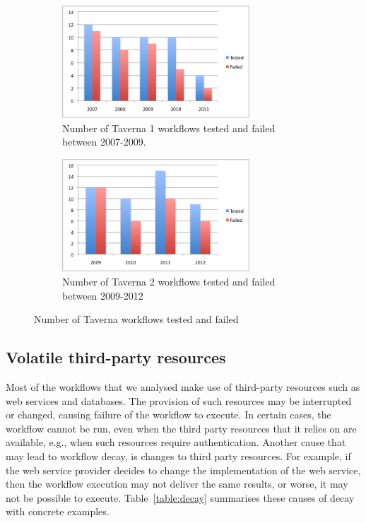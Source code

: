 \begin{figure}[h]
  \centering
  \begin{subfigure}[t]{9cm}
    \centering
    \includegraphics[width=7cm]{./Figures/taverna1-workflows-rate.png}
    \caption{Number of Taverna 1 workflows tested and failed between 2007-2009.}
  \end{subfigure}
  \begin{subfigure}[t]{9cm}
    \centering
    \includegraphics[width=7cm]{./Figures/taverna2-workflows-rate.png}
    \caption{Number of Taverna 2 workflows tested and failed between 2009-2012}
  \end{subfigure}
  \caption{Number of Taverna workflows tested and failed}
  \label{fig:taverna-wf-failed}
\end{figure}



\subsection{Volatile third-party resources}
Most of the workflows that we analysed make use of third-party resources such as web services and databases.
The provision of such resources may be interrupted or changed, causing failure of the workflow to execute. In certain cases, the workflow cannot be run, even when the third party resources that it relies on are available, e.g.,  when such resources require authentication. Another cause that may lead to workflow decay, is changes to third party resources. For example, if the web service provider decides to change the implementation of the web service, then the workflow execution may not deliver the same results, or worse, it may not be possible to execute. Table~\ref{table:decay} summarises these causes of decay with concrete examples.


